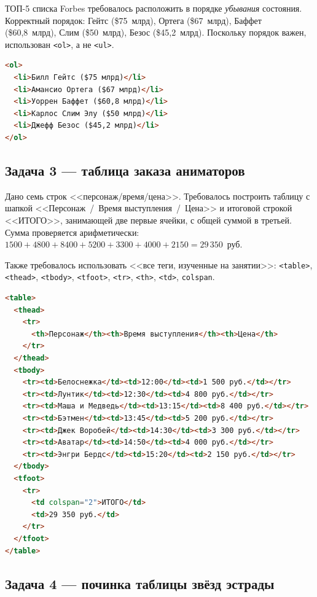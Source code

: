 ТОП-5 списка Forbes требовалось расположить в порядке \emph{убывания}
состояния. Корректный порядок: Гейтс (\$75~млрд), Ортега
(\$67~млрд), Баффет (\$60{,}8~млрд), Слим (\$50~млрд), Безос
(\$45{,}2~млрд). Поскольку порядок важен, использован
\texttt{<ol>}, а не \texttt{<ul>}.

\begin{lstlisting}[language=HTML]
<ol>
  <li>Билл Гейтс ($75 млрд)</li>
  <li>Амансио Ортега ($67 млрд)</li>
  <li>Уоррен Баффет ($60,8 млрд)</li>
  <li>Карлос Слим Элу ($50 млрд)</li>
  <li>Джефф Безос ($45,2 млрд)</li>
</ol>
\end{lstlisting}

\subsection{Задача 3 --- таблица заказа аниматоров}

Дано семь строк <<персонаж/время/цена>>. Требовалось построить
таблицу с шапкой <<Персонаж~/~Время выступления~/~Цена>> и итоговой
строкой <<ИТОГО>>, занимающей две первые ячейки, с общей суммой в
третьей. Сумма проверяется арифметически:
$1500+4800+8400+5200+3300+4000+2150=29\,350$~руб.

Также требовалось использовать <<все теги, изученные на занятии>>:
\texttt{<table>}, \texttt{<thead>}, \texttt{<tbody>},
\texttt{<tfoot>}, \texttt{<tr>}, \texttt{<th>}, \texttt{<td>},
\texttt{colspan}.

\begin{lstlisting}[language=HTML]
<table>
  <thead>
    <tr>
      <th>Персонаж</th><th>Время выступления</th><th>Цена</th>
    </tr>
  </thead>
  <tbody>
    <tr><td>Белоснежка</td><td>12:00</td><td>1 500 руб.</td></tr>
    <tr><td>Лунтик</td><td>12:30</td><td>4 800 руб.</td></tr>
    <tr><td>Маша и Медведь</td><td>13:15</td><td>8 400 руб.</td></tr>
    <tr><td>Бэтмен</td><td>13:45</td><td>5 200 руб.</td></tr>
    <tr><td>Джек Воробей</td><td>14:30</td><td>3 300 руб.</td></tr>
    <tr><td>Аватар</td><td>14:50</td><td>4 000 руб.</td></tr>
    <tr><td>Энгри Бердс</td><td>15:20</td><td>2 150 руб.</td></tr>
  </tbody>
  <tfoot>
    <tr>
      <td colspan="2">ИТОГО</td>
      <td>29 350 руб.</td>
    </tr>
  </tfoot>
</table>
\end{lstlisting}

\subsection{Задача 4 --- починка таблицы звёзд эстрады}

